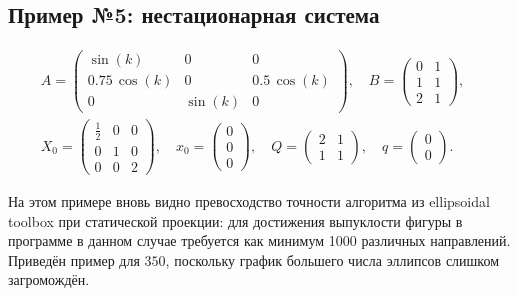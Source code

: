 \documentclass[10pt, a4paper]{article}
\begin{document}
\subsection{Пример №5: нестационарная система}
\begin{gather*}
A =
\left(\begin{array}{ccc} \sin\!\left(k\right) & 0 & 0\\ 0.75\, \cos\!\left(k\right) & 0 & 0.5\, \cos\!\left(k\right)\\ 0 & \sin\!\left(k\right) & 0 \end{array}\right), \quad
B =
\left(\begin{array}{cc} 0 & 1\\ 1 & 1\\ 2 & 1 \end{array}\right), \quad \\
X_0 =
\left(\begin{array}{ccc} \frac{1}{2} & 0 & 0\\ 0 & 1 & 0\\ 0 & 0 & 2 \end{array}\right), \quad
x_0 =
\left(\begin{array}{c} 0\\ 0\\ 0 \end{array}\right), \quad
Q=
\left(\begin{array}{cc} 2 & 1\\ 1 & 1 \end{array}\right), \quad
q =
\left(\begin{array}{c} 0\\ 0 \end{array}\right).
\end{gather*}

На этом примере вновь видно превосходство точности алгоритма из ellipsoidal toolbox при статической проекции: для достижения выпуклости фигуры в программе в данном случае требуется как минимум 1000 различных направлений. Приведён пример для $350$, поскольку график большего числа эллипсов слишком загромождён.
\end{document}
